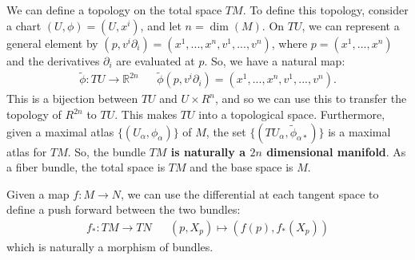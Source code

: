 We can define a topology on the total space $TM$. To define this topology, consider a chart $(U, \phi) = (U, x^i)$, and let $n = 
\dim(M)$. On $TU$, we can represent a general element by $(p, v^i\partial_i) = (x^1, ..., x^n, v^1, ..., v^n)$, where $p = 
(x^1, ..., x^n)$ and the derivatives $\partial_i$ are evaluated at $p$. So, we have a natural map:
\begin{align}
	\tilde \phi : TU \rightarrow \mathbb R^{2n} &&
	\tilde\phi \left(p, v^i\partial_i \right) = \left(x^1, ..., x^n, v^1, ..., v^n \right).
\end{align}
This is a bijection between $TU$ and $U\times R^n$, and so we can use this to transfer the topology of $R^{2n}$ to $TU$. 
This makes $TU$ into a topological space. Furthermore, given a maximal atlas $\{(U_\alpha, \phi_\alpha)\}$ of $M$, the 
set $\{(TU_\alpha, \tilde \phi_{\alpha *})\}$ is a maximal atlas for $TM$. So, the bundle \textbf{$TM$ is naturally a $2n$ 
dimensional manifold}. As a fiber bundle, the total space is $TM$ and the base space is $M$. 

Given a map $f : M\rightarrow N$, we can use the differential at each tangent space to define a push forward between the two bundles:
\begin{align}
	f_* : TM \rightarrow TN &&
		(p, X_p) \mapsto (f(p), f_*(X_p))
\end{align}
which is naturally a morphism of bundles. 

